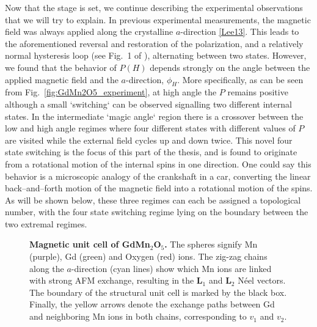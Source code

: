 Now that the stage is set, we continue describing the experimental observations that we will try to explain. In previous experimental measurements, the magnetic field was always applied along the crystalline $a$-direction \ref{Lee13}. This leads to the aforementioned reversal and restoration of the polarization, and a relatively normal hysteresis loop (see Fig.~1 of \cite{Lee13}), alternating between two states. However, we found that the behavior of $P(H)$ depends strongly on the angle between the applied magnetic field and the $a$-direction, $\phi_H$.
More specifically, as can be seen from Fig.~\ref{fig:GdMn2O5_experiment}, at high angle the $P$ remains positive although a small `switching` can be observed signalling two different internal states. In the intermediate `magic angle` region there is a crossover between the low and high angle regimes where four different states with different values of $P$ are visited while the external field cycles up and down twice.
This novel four state switching is the focus of this part of the thesis, and is found to originate from a rotational motion of the internal spins in one direction. One could say this behavior is a microscopic analogy of the crankshaft in a car, converting the linear back--and--forth motion of the magnetic field into a rotational motion of the spins.
As will be shown below, these three regimes can each be assigned a topological number, with the four state switching regime lying on the boundary between the two extremal regimes. 

\begin{figure}
	\caption{\label{fig:GdMn2O5_unit_cell}{\bf Magnetic unit cell of GdMn$_2$O$_5$.} The spheres signify Mn (purple), Gd (green) and Oxygen (red) ions. The zig-zag chains along the $a$-direction (cyan lines) show which Mn ions are linked with strong AFM exchange, resulting in the $\mathbf{L}_1$ and $\mathbf{L}_2$ N\'eel vectors. The boundary of the structural unit cell is marked by the black box. Finally, the yellow arrows denote the exchange paths between Gd and neighboring Mn ions in both chains, corresponding to $v_1$ and $v_2$.}
\end{figure}

